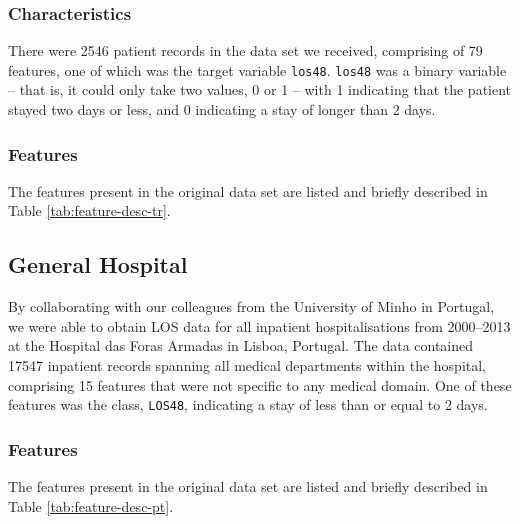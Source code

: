 \subsubsection{Characteristics}
There were 2546 patient records in the data set we received, comprising of 79
features, one of which was the target variable \texttt{los48}.
\texttt{los48} was a binary variable -- that is, it could only take two
values, 0 or 1 -- with 1 indicating that the patient stayed two days or less,
and 0 indicating a stay of longer than 2 days.

\subsubsection{Features}
The features present in the original data set are listed and briefly described
in Table \ref{tab:feature-desc-tr}.

\subsection{General Hospital}
By collaborating with our colleagues from the University of Minho in Portugal,
we were able to obtain LOS data for all inpatient hospitalisations from
2000--2013 at the Hospital das Foras Armadas in Lisboa, Portugal. The data
contained 17547 inpatient records spanning all medical departments within the
hospital, comprising 15 features that were not specific to any medical domain.
One of these features was the class, \texttt{LOS48}, indicating a stay of
less than or equal to 2 days.

\subsubsection{Features}
The features present in the original data set are listed and briefly described
in Table \ref{tab:feature-desc-pt}.



